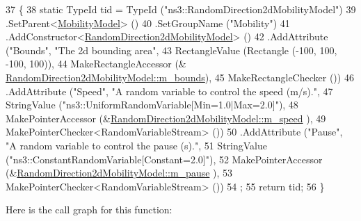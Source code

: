 \begin{DoxyCode}
37 \{
38   \textcolor{keyword}{static} TypeId tid = TypeId (\textcolor{stringliteral}{"ns3::RandomDirection2dMobilityModel"})
39     .SetParent<\hyperlink{classns3_1_1MobilityModel_af61ca3dbc723d8109d115fb081fd0299}{MobilityModel}> ()
40     .SetGroupName (\textcolor{stringliteral}{"Mobility"})
41     .AddConstructor<\hyperlink{classns3_1_1RandomDirection2dMobilityModel_acdd09400e87ef90737d2399af5321cb2}{RandomDirection2dMobilityModel}> ()
42     .AddAttribute (\textcolor{stringliteral}{"Bounds"}, \textcolor{stringliteral}{"The 2d bounding area"},
43                    RectangleValue (Rectangle (-100, 100, -100, 100)),
44                    MakeRectangleAccessor (&
      \hyperlink{classns3_1_1RandomDirection2dMobilityModel_ab9fc659153e4170091daf982f629cfe7}{RandomDirection2dMobilityModel::m\_bounds}),
45                    MakeRectangleChecker ())
46     .AddAttribute (\textcolor{stringliteral}{"Speed"}, \textcolor{stringliteral}{"A random variable to control the speed (m/s)."},
47                    StringValue (\textcolor{stringliteral}{"ns3::UniformRandomVariable[Min=1.0|Max=2.0]"}),
48                    MakePointerAccessor (&\hyperlink{classns3_1_1RandomDirection2dMobilityModel_aa227a9500fcbe1a7436a95c8f017ca94}{RandomDirection2dMobilityModel::m\_speed}
      ),
49                    MakePointerChecker<RandomVariableStream> ())
50     .AddAttribute (\textcolor{stringliteral}{"Pause"}, \textcolor{stringliteral}{"A random variable to control the pause (s)."},
51                    StringValue (\textcolor{stringliteral}{"ns3::ConstantRandomVariable[Constant=2.0]"}),
52                    MakePointerAccessor (&\hyperlink{classns3_1_1RandomDirection2dMobilityModel_aef102cfa4b6e22a2292b1f82ac16bf76}{RandomDirection2dMobilityModel::m\_pause}
      ),
53                    MakePointerChecker<RandomVariableStream> ())
54   ;
55   \textcolor{keywordflow}{return} tid;
56 \}
\end{DoxyCode}


Here is the call graph for this function\+:


